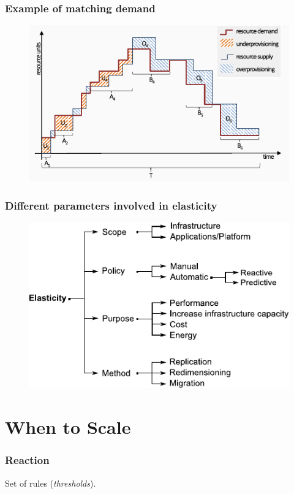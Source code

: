 \documentclass{beamer}
\begin{document}
\begin{frame}
  \frametitle{Example of matching demand~\cite{herbst2013elasticity}}
  \begin{figure}
    \includegraphics[clip, width=\textwidth]{images/workload}
  \end{figure}
\end{frame}

\begin{frame}
  \frametitle{Different parameters involved in elasticity}
  \begin{figure}
    \includegraphics[width=\textwidth]{images/elasticity2}
  \end{figure}
\end{frame}


\section{When to Scale}
\begin{frame}
  \frametitle{Reaction}
  Set of rules (\textit{thresholds}).
\end{frame}
\end{document}
